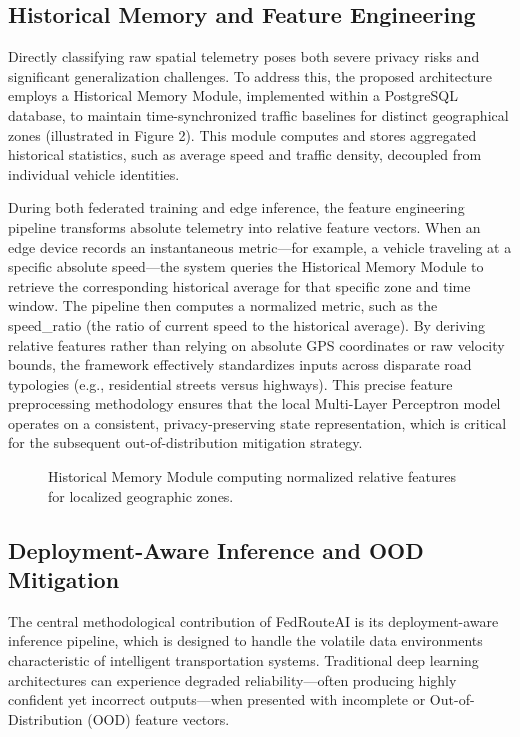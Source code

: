 \subsection{Historical Memory and Feature Engineering}

Directly classifying raw spatial telemetry poses both severe privacy risks and significant generalization challenges. To address this, the proposed architecture employs a Historical Memory Module, implemented within a PostgreSQL database, to maintain time-synchronized traffic baselines for distinct geographical zones (illustrated in Figure 2). This module computes and stores aggregated historical statistics, such as average speed and traffic density, decoupled from individual vehicle identities. 

During both federated training and edge inference, the feature engineering pipeline transforms absolute telemetry into relative feature vectors. When an edge device records an instantaneous metric---for example, a vehicle traveling at a specific absolute speed---the system queries the Historical Memory Module to retrieve the corresponding historical average for that specific zone and time window. The pipeline then computes a normalized metric, such as the speed\_ratio (the ratio of current speed to the historical average). By deriving relative features rather than relying on absolute GPS coordinates or raw velocity bounds, the framework effectively standardizes inputs across disparate road typologies (e.g., residential streets versus highways). This precise feature preprocessing methodology ensures that the local Multi-Layer Perceptron model operates on a consistent, privacy-preserving state representation, which is critical for the subsequent out-of-distribution mitigation strategy.

\begin{figure}[htbp]
\centering
\caption{Historical Memory Module computing normalized relative features for localized geographic zones.}
\label{fig:historical_memory}
\end{figure}

\subsection{Deployment-Aware Inference and OOD Mitigation}

The central methodological contribution of FedRouteAI is its deployment-aware inference pipeline, which is designed to handle the volatile data environments characteristic of intelligent transportation systems. Traditional deep learning architectures can experience degraded reliability---often producing highly confident yet incorrect outputs---when presented with incomplete or Out-of-Distribution (OOD) feature vectors. 

